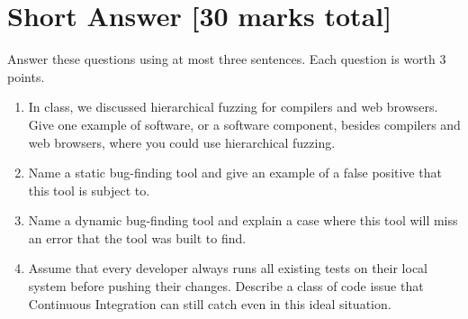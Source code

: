 \documentclass[12pt]{article}
\renewcommand{\headrulewidth}{0pt}     %
\begin{document}

%
\newpage
\renewcommand{\headrulewidth}{0.4pt}  %



\section{Short Answer [30 marks total]}
Answer these questions using at most three sentences. Each question is worth 3 points.

\begin{enumerate}[label=(\alph*)]
\item In class, we discussed hierarchical fuzzing for compilers and web browsers. Give one
example of software, or a software component, besides compilers and web browsers,
where you could use hierarchical fuzzing.
\vspace*{8em}

\item Name a static bug-finding tool and give an example of a
false positive that this tool is subject to.
\vspace*{8em}

\item
Name a dynamic bug-finding tool and explain a case where this tool
will miss an error that the tool was built to find.
\vspace*{8em}

\item Assume that every developer always runs all existing tests on their
local system before pushing their changes. Describe a class of code
issue that Continuous Integration can still catch even in this ideal
situation.
\vspace*{8em}


\end{enumerate}
\end{document}
